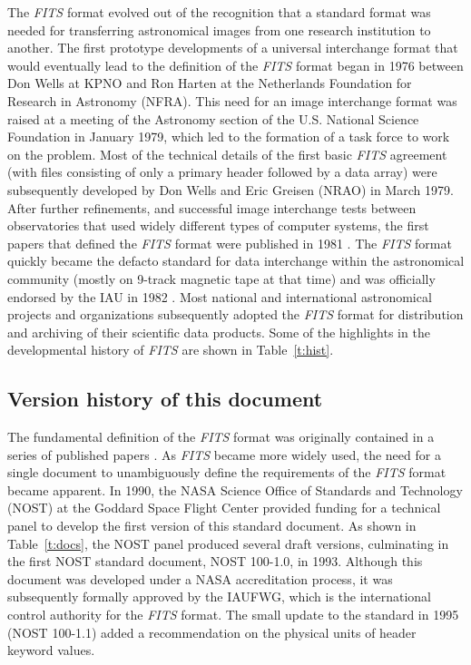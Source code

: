 \documentclass[onecolumn]{aa}
\begin{document}
  The {\em FITS\/} format evolved out of the
  recognition that a standard format was needed for 
  transferring astronomical images from one research institution to another.  
  The first prototype developments of a universal interchange format that would
  eventually lead to the definition of the {\em FITS\/} format began 
  in 1976 between Don Wells at KPNO and  Ron Harten at the Netherlands 
  Foundation for Research in Astronomy (NFRA).  This need for an image
  interchange format was raised at a meeting of the Astronomy
  section of the U.S. National Science Foundation in January 1979, which led 
  to the formation of a task force to work on the problem.  Most of the
  technical details of the first basic {\em FITS\/} agreement (with files
  consisting of only a primary header followed by a data array) were
  subsequently developed by Don Wells and Eric Greisen (NRAO) in March 1979.
  After further refinements, and successful image interchange tests 
  between observatories that used widely
  different types of computer systems, the first papers that defined the
  {\em FITS\/} format were published in 1981 \citep{wells81, greisen81}.   The {\em FITS\/} format
  quickly became the defacto standard for data interchange 
  within the astronomical community  (mostly on 
  9-track magnetic tape at that time) and  was officially
  endorsed by the IAU  in 1982 \citep{iau83}.  Most national and international
  astronomical projects and organizations subsequently adopted the {\em FITS\/} format
  for distribution and archiving of their scientific data products.
  Some of the highlights in the developmental history of {\em FITS}
  are shown in Table~\ref{t:hist}.




\subsection{Version history of this document}
\label{s:versionhist}

The fundamental definition of the {\em FITS\/} format was originally
contained in a series of published papers \citep{wells81, greisen81, 
grosbol88, harten88}. As
{\em FITS\/} became more widely used, the need for a 
single document to unambiguously define the requirements of
the {\em FITS\/} format became apparent.  
In 1990, the NASA Science Office of Standards and Technology
(NOST) at the Goddard Space Flight Center provided funding 
for a technical panel to develop the first version of this standard
document.   As shown in Table~\ref{t:docs}, the NOST panel produced several
draft versions, culminating in the first NOST standard document, NOST 100-1.0,
in 1993.  Although this document was developed under a NASA accreditation process, 
it was subsequently formally approved by the IAUFWG,  which is the international
control authority for the {\em FITS\/} format.  The small update to the standard
in 1995 (NOST 100-1.1) added a recommendation on the physical units of header
keyword values.
\end{document}
